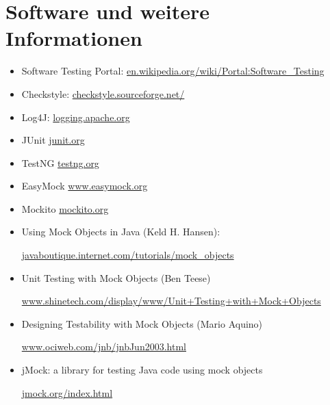 \section{Software und weitere Informationen}
\begin{itemize}
\item Software Testing Portal:
\href{http://en.wikipedia.org/wiki/Portal:Software_Testing}
{en.wikipedia.org/wiki/Portal:Software\_Testing}
\item Checkstyle: \href{http://checkstyle.sourceforge.net/}
                         {checkstyle.sourceforge.net/}
\item Log4J: \href{http://logging.apache.org}{logging.apache.org}
\item JUnit \href{http://junit.org}{junit.org}
\item TestNG \href{http://testng.org}{testng.org}
\item EasyMock \href{http://www.easymock.org}{www.easymock.org}
\item Mockito \href{http://mockito.org}{mockito.org}
\item Using Mock Objects in Java (Keld H. Hansen):

  \href{http://javaboutique.internet.com/tutorials/mock_objects}
  {javaboutique.internet.com/tutorials/mock\_objects}
\item Unit Testing with Mock Objects (Ben Teese)

\href{http://www.shinetech.com/display/www/Unit+Testing+with+Mock+Objects}
   {www.shinetech.com/display/www/Unit+Testing+with+Mock+Objects}

\item Designing Testability with Mock Objects (Mario Aquino)

\href{http://www.ociweb.com/jnb/jnbJun2003.html}
  {www.ociweb.com/jnb/jnbJun2003.html}

\item jMock: a library for testing Java code using mock objects

\href{http://jmock.org/index.html}{jmock.org/index.html}


\end{itemize}
